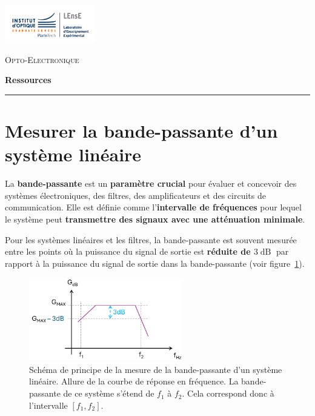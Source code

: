 \newpage
\pagestyle{empty}

\begin{minipage}[c]{.25\linewidth}
	\includegraphics[width=4cm]{images/Logo-LEnsE.png}
\end{minipage} \hfill
\begin{minipage}[c]{.4\linewidth}

\begin{center}
\vspace{0.3cm}
{\Large \textsc{Opto-Electronique}}

\medskip

\textbf{\Large Ressources}

\end{center}
\end{minipage}\hfill

\vspace{0.5cm}

\noindent \rule{\linewidth}{1pt}
\section{Mesurer la bande-passante d'un système linéaire}
\label{ressource:BandePassante}



La \textbf{bande-passante} est un \textbf{paramètre crucial} pour évaluer et concevoir des systèmes électroniques, des filtres, des amplificateurs et des circuits de communication. Elle est définie comme l'\textbf{intervalle de fréquences} pour lequel le système peut \textbf{transmettre des signaux avec une atténuation minimale}.

\medskip

Pour les systèmes linéaires et les filtres, la bande-passante est souvent mesurée entre les points où la puissance du signal de sortie est \textbf{réduite de $3\operatorname{dB}$} par rapport à la puissance du signal de sortie dans la bande-passante (voir figure~\ref{fig:rf_bp}).

\begin{figure}[h!]
    \centering
	\includegraphics[width=0.6\textwidth]{images/bande_passante.png}
	
    \caption{Schéma de principe de la mesure de la bande-passante d'un système linéaire. Allure de la courbe de réponse en fréquence. La bande-passante de ce système s'étend de $f_1$ à $f_2$. Cela correspond donc à l'intervalle $\left[ f_1, f_2 \right]$.}
    \label{fig:rf_bp}
\end{figure}




